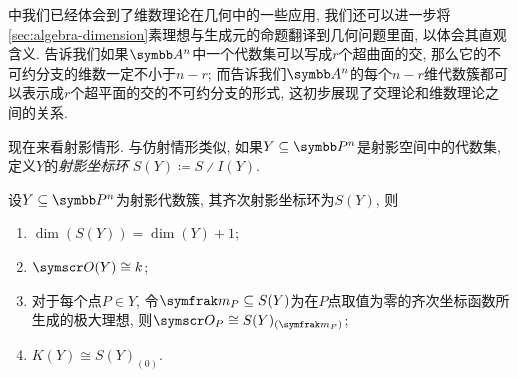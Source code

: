 中我们已经体会到了维数理论在几何中的一些应用, 我们还可以进一步将\ref{sec:algebra-dimension}素理想与生成元的命题翻译到几何问题里面, 以体会其直观含义. 告诉我们如果$\AF^n$中一个代数集可以写成$r$个超曲面的交, 那么它的不可约分支的维数一定不小于$n-r$; 而告诉我们$\AF^n$的每个$n-r$维代数簇都可以表示成$r$个超平面的交的不可约分支的形式, 这初步展现了交理论和维数理论之间的关系.

\bigskip

现在来看射影情形. 与仿射情形类似, 如果$Y\subseteq \PP^n$是射影空间中的代数集, 定义$Y$的\emph{射影坐标环} $S(Y)\coloneq S{\divslash}I(Y)$.

\begin{theorem}\label{thm:projectiverings}
  设$Y\subseteq\PP^n$为射影代数簇, 其齐次射影坐标环为$S(Y)$, 则
  \begin{enumerate}
    \item\label{enum:thm-projective-rings-1} $\dim (S(Y))=\dim (Y)+1$;
    \item\label{enum:thm-projective-rings-2} $\OO (Y)\cong\kk$;
    \item\label{enum:thm-projective-rings-3} 对于每个点$P\in Y$, 令$\ideal{m}_P\subseteq S(Y)$为在$P$点取值为零的齐次坐标函数所生成的极大理想, 则$\OO_P\cong S(Y)_{(\ideal{m}_P)}$;
    \item\label{enum:thm-projective-rings-4} $K(Y)\cong S(Y)_{(0)}$.
  \end{enumerate}
\end{theorem}

